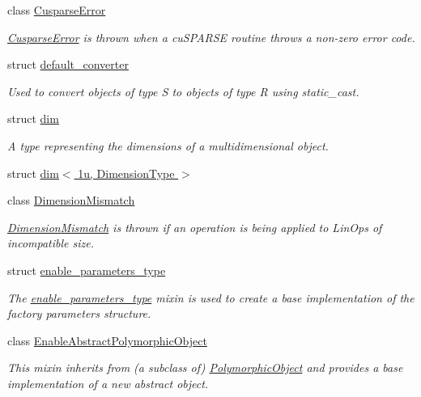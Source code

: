 \begin{DoxyCompactItemize}
class \hyperlink{classgko_1_1CusparseError}{Cusparse\+Error}
\begin{DoxyCompactList}\small\item\em \hyperlink{classgko_1_1CusparseError}{Cusparse\+Error} is thrown when a cu\+S\+P\+A\+R\+SE routine throws a non-\/zero error code. \end{DoxyCompactList}\item 
struct \hyperlink{structgko_1_1default__converter}{default\+\_\+converter}
\begin{DoxyCompactList}\small\item\em Used to convert objects of type {\ttfamily S} to objects of type {\ttfamily R} using static\+\_\+cast. \end{DoxyCompactList}\item 
struct \hyperlink{structgko_1_1dim}{dim}
\begin{DoxyCompactList}\small\item\em A type representing the dimensions of a multidimensional object. \end{DoxyCompactList}\item 
struct \hyperlink{structgko_1_1dim_3_011u_00_01DimensionType_01_4}{dim$<$ 1u, Dimension\+Type $>$}
\item 
class \hyperlink{classgko_1_1DimensionMismatch}{Dimension\+Mismatch}
\begin{DoxyCompactList}\small\item\em \hyperlink{classgko_1_1DimensionMismatch}{Dimension\+Mismatch} is thrown if an operation is being applied to Lin\+Ops of incompatible size. \end{DoxyCompactList}\item 
struct \hyperlink{structgko_1_1enable__parameters__type}{enable\+\_\+parameters\+\_\+type}
\begin{DoxyCompactList}\small\item\em The \hyperlink{structgko_1_1enable__parameters__type}{enable\+\_\+parameters\+\_\+type} mixin is used to create a base implementation of the factory parameters structure. \end{DoxyCompactList}\item 
class \hyperlink{classgko_1_1EnableAbstractPolymorphicObject}{Enable\+Abstract\+Polymorphic\+Object}
\begin{DoxyCompactList}\small\item\em This mixin inherits from (a subclass of) \hyperlink{classgko_1_1PolymorphicObject}{Polymorphic\+Object} and provides a base implementation of a new abstract object. \end{DoxyCompactList}\item 

\end{DoxyCompactItemize}
